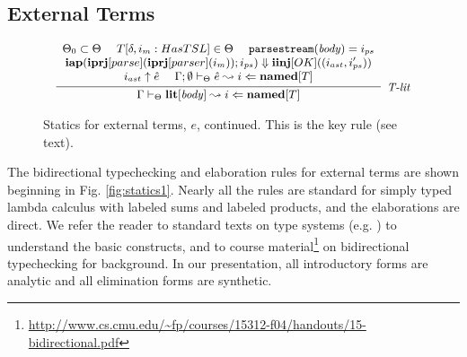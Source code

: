 \subsection{External Terms}
\begin{figure}[t]
\centering
\[
\footnotesize
\begin{array}{c}
\infer[\textit{T-lit}]
	  {\Gamma \vdash_\Theta \keyw{lit}[\mathit{body}] \leadsto i \Leftarrow \keyw{named}[T]}
	  {\begin{array}{c}
	   \Theta_0 \subset \Theta ~~~~
	   T[\delta, i_m : HasTSL] \in \Theta ~~~~
	   \mathtt{parsestream}(\mathit{body})=i_{ps} \\
	   \keyw{iap}(\keyw{iprj}[parse](\keyw{iprj}[parser](i_m)); i_{ps}) \Downarrow \keyw{iinj}[OK]((i_{ast}, i'_{ps}))\\
	   i_{ast} \uparrow \ih~~~~
	   \Gamma; \emptyset \vdash_\Theta \ih \leadsto i \Leftarrow \keyw{named}[T]
	   \end{array}}
\end{array}
\]
\caption{Statics for external terms, $e$, continued. This is the key rule (see text).}
\label{fig:statics-lit}
\end{figure}

The bidirectional typechecking and elaboration rules for external terms are shown beginning in Fig. \ref{fig:statics1}. Nearly all the rules are standard for simply typed lambda calculus with labeled sums and labeled products, and the elaborations are direct. We refer the reader to standard texts on type systems (e.g. \cite{pfpl}) to understand the basic constructs, and to course material\footnote{\small \url{http://www.cs.cmu.edu/~fp/courses/15312-f04/handouts/15-bidirectional.pdf}} on bidirectional typechecking for background. In our presentation, all introductory forms are analytic and all elimination forms are synthetic. 

